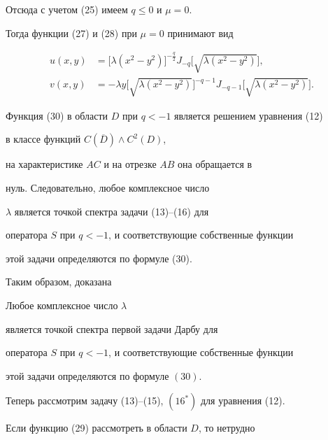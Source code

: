 Отсюда с учетом (25) имеем $q \le 0$ и $\mu = 0$.


Тогда функции (27) и (28) при $\mu = 0$ принимают вид


\begin{align}


u(x,y)&=


\big[\lambda (x^2-y^2)\big]^{{-\frac{q}{2}}}J_{-q}


\big[\sqrt{\lambda (x^2-y^2)}\big], \\


%


v(x,y)&=-\lambda y\big[\sqrt{\lambda (x^2-y^2)}\big]^{-q-1}J_{-q-1}


\big[\sqrt{\lambda (x^2-y^2)}\big].


\end{align}


Функция (30) в области $D$ при $q<-1$ является решением уравнения (12)


в классе функций $C(\overline D)\land C^2(D)$,


на характеристике $AC$ и на отрезке $AB$ она обращается в


нуль. Следовательно, любое комплексное число


$\lambda$ является точкой спектра задачи (13)--(16) для


оператора $S$ при $q<-1$, и соответствующие собственные функции


этой задачи определяются по формуле (30).





Таким образом, доказана





\begin{thm}


Любое комплексное число $\lambda$


является точкой спектра первой задачи Дарбу для


оператора $S$ при $q<-1$, и соответствующие собственные функции


этой задачи определяются по формуле $(30)$.


\end{thm}





Теперь рассмотрим задачу (13)--(15), $(16^*)$ для уравнения (12).


Если функцию (29) рассмотреть в области $D$, то нетрудно


